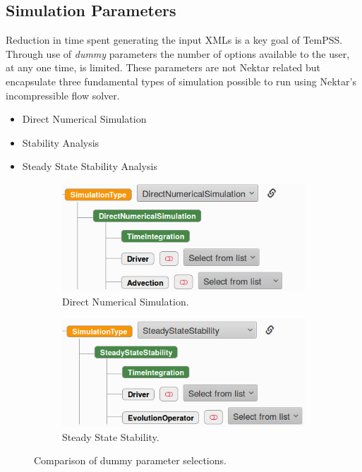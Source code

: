 \documentclass[11pt, a4paper]{report}
\begin{document}
\subsection{Simulation Parameters}
Reduction in time spent generating the input XMLs is a key goal of TemPSS. Through use of \textit{dummy} parameters the number of options available to the user, at any one time, is limited. These parameters are not Nektar related but encapsulate three fundamental types of simulation possible to run using Nektar's incompressible flow solver.
\begin{itemize}
\item Direct Numerical Simulation
\item Stability Analysis
\item Steady State Stability Analysis
\end{itemize}

\begin{figure}[!htb]
\centering
\begin{subfigure}{.5\textwidth}
  \centering
  \includegraphics[width=1\linewidth]{dns}
  \caption{Direct Numerical Simulation.}
  \label{fig:dummy_dns}
\end{subfigure}%
\begin{subfigure}{.5\textwidth}
  \centering
  \includegraphics[width=1\linewidth]{steady_stability}
  \caption{Steady State Stability.}
  \label{fig:dummy_steady_state}
\end{subfigure}
\caption{Comparison of dummy parameter selections.}
\label{fig:dummy_params}
\end{figure}
\end{document}
